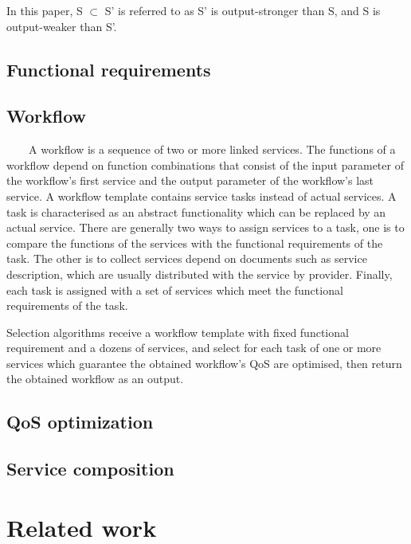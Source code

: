 \documentclass[senior,final,11pt]{iscs-thesis}
\begin{document}
In this paper, S $\subset$ S' is referred to as S' is output-stronger than S, and S is output-weaker than S'.\\

\section{Functional requirements}

\section{Workflow}
~~~~A workflow is a sequence of two or more linked services. The functions of a workflow depend on function combinations that consist of the input parameter of the workflow's first service and the output parameter of the workflow's last service. A workflow template contains service tasks instead of actual services. A task is characterised as an abstract functionality which can be replaced by an actual service. There are generally two ways to assign services to a task, one is to compare the functions of the services with the functional requirements of the task. The other is to collect services depend on documents such as service description, which are usually distributed with the service by provider. Finally, each task is assigned with a set of services which meet the functional requirements of the task.

Selection algorithms receive a workflow template with fixed functional requirement and a dozens of services, and select for each task of one or more services which guarantee the obtained workflow's QoS are optimised, then return the obtained workflow as an output.



\section{QoS optimization}%
\section{Service composition}
\chapter{Related  work}
\end{document}
